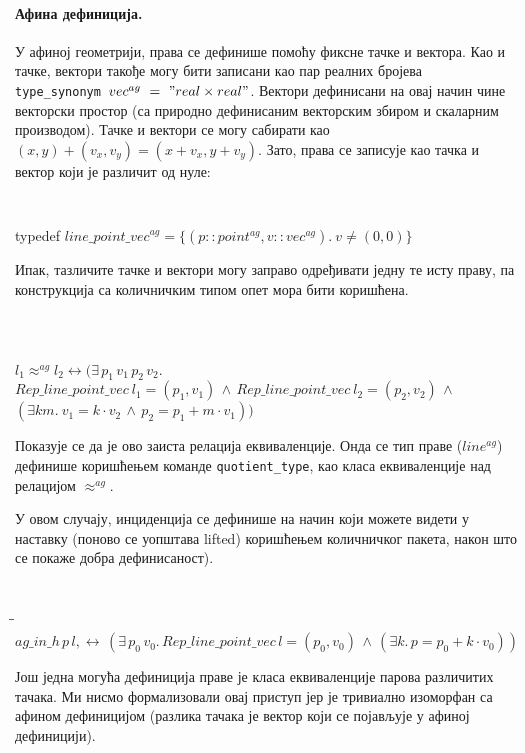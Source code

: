 \documentclass[a4paper, 12pt]{article}
\begin{document}
\paragraph{Афина дефиниција.}
У афиној геометрији, права се дефинише помоћу фиксне тачке и
вектора. Као и тачке, вектори такође могу бити записани као пар
реалних бројева {\tt type\_synonym\ $vec^{ag}\ =\ "real \times
  real"$}. Вектори дефинисани на овај начин чине векторски простор (са
природно дефинисаним векторским збиром и скаларним производом). Тачке
и вектори се могу сабирати као $(x, y) + (v_x, v_y) = (x + v_x, y +
v_y)$. Зато, права се записује као тачка и вектор који је различит од
нуле: 
{\tt
\begin{tabbing}
typedef $\mathit{line\_point\_vec}^{ag} =\{(p::point^{ag}, v::vec^{ag}).\ v \neq (0, 0)\}$
\end{tabbing}
}

Ипак, тазличите тачке и вектори могу заправо одређивати једну те исту
праву, па конструкција са количничким типом опет мора бити коришћена.

{\tt
\begin{tabbing}
\hspace{5mm}\=\\
$l_1 \approx^{ag} l_2 \longleftrightarrow (\exists\,p_1\,v_1\,p_2\,v_2.$\\
\>$\mathit{Rep\_line\_point\_vec}\ l_1 = (p_1, v_1) \,\wedge\,  \mathit{Rep\_line\_point\_vec}\ l_2 = (p_2, v_2) \,\wedge$\\
\>$(\exists k m.\ v_1 = k\cdot v_2 \,\wedge\, p_2 = p_1 + m\cdot v_1))$
\end{tabbing}
}
\noindent Показује се да је ово заиста релација еквиваленције. Онда се
тип праве ($\mathit{line^{ag}}$) дефинише коришћењем команде
\verb|quotient_type|, као класа еквиваленције над релацијом
$\approx^{ag}$.

У овом случају, инциденција се дефинише на начин који можете видети у
наставку (поново се уопштава lifted) коришћењем количничког пакета,
након што се покаже добра дефинисаност).

{\tt
\begin{tabbing}
\hspace{5mm}\=\hspace{5mm}\=\kill
$ag\_in\_h\,p\,l,\longleftrightarrow\,(\exists\,p_0\,v_0.\,\mathit{Rep\_line\_point\_vec}\,l = (p_0, v_0) \,\wedge\,  (\exists k.\,p = p_0 + k \cdot v_0))$
\end{tabbing}
}

Још једна могућа дефиниција праве је класа еквиваленције парова
различитих тачака. Ми нисмо формализовали овај приступ јер је
тривиално изоморфан са афином дефиницијом (разлика тачака је вектор
који се појављује у афиној дефиницији).
\end{document}
